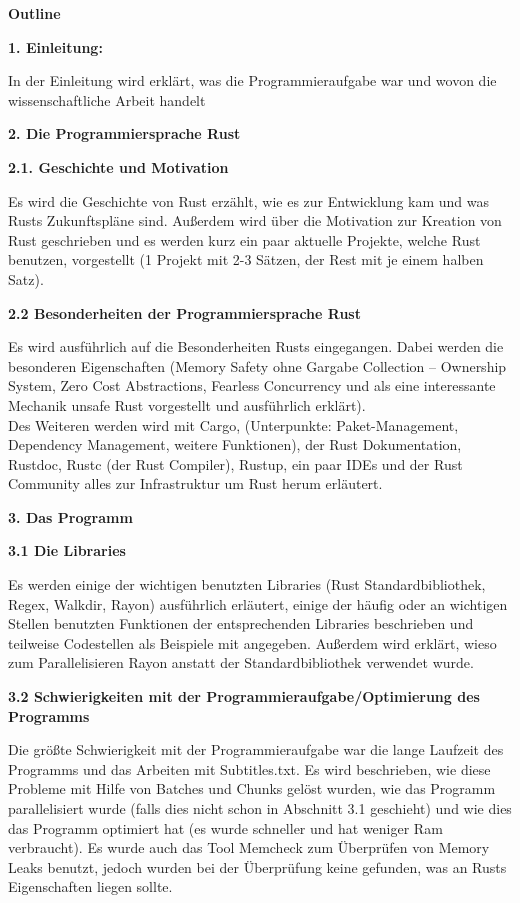 \documentclass[
]{article}
\author{}
\date{}
\begin{document}
\textbf{Outline}

\textbf{1. Einleitung:}

In der Einleitung wird erklärt, was die Programmieraufgabe war und wovon
die wissenschaftliche Arbeit handelt

\textbf{2. Die Programmiersprache Rust}

\textbf{2.1. Geschichte und Motivation}

Es wird die Geschichte von Rust erzählt, wie es zur Entwicklung kam und
was Rusts Zukunftspläne sind. Außerdem wird über die Motivation zur
Kreation von Rust geschrieben und es werden kurz ein paar aktuelle
Projekte, welche Rust benutzen, vorgestellt (1 Projekt mit 2-3 Sätzen,
der Rest mit je einem halben Satz).

\textbf{2.2 Besonderheiten der Programmiersprache Rust}

Es wird ausführlich auf die Besonderheiten Rusts eingegangen. Dabei
werden die besonderen Eigenschaften (Memory Safety ohne Gargabe
Collection -- Ownership System, Zero Cost Abstractions, Fearless
Concurrency und als eine interessante Mechanik unsafe Rust vorgestellt
und ausführlich erklärt).\\
Des Weiteren werden wird mit Cargo, (Unterpunkte: Paket-Management,
Dependency Management, weitere Funktionen), der Rust Dokumentation,
Rustdoc, Rustc (der Rust Compiler), Rustup, ein paar IDEs und der Rust
Community alles zur Infrastruktur um Rust herum erläutert.

\textbf{3. Das Programm}

\textbf{3.1 Die Libraries}

Es werden einige der wichtigen benutzten Libraries (Rust
Standardbibliothek, Regex, Walkdir, Rayon) ausführlich erläutert, einige
der häufig oder an wichtigen Stellen benutzten Funktionen der
entsprechenden Libraries beschrieben und teilweise Codestellen als
Beispiele mit angegeben. Außerdem wird erklärt, wieso zum
Parallelisieren Rayon anstatt der Standardbibliothek verwendet wurde.

\textbf{3.2 Schwierigkeiten mit der Programmieraufgabe/Optimierung des
Programms}

Die größte Schwierigkeit mit der Programmieraufgabe war die lange
Laufzeit des Programms und das Arbeiten mit Subtitles.txt. Es wird
beschrieben, wie diese Probleme mit Hilfe von Batches und Chunks gelöst
wurden, wie das Programm parallelisiert wurde (falls dies nicht schon in
Abschnitt 3.1 geschieht) und wie dies das Programm optimiert hat (es
wurde schneller und hat weniger Ram verbraucht). Es wurde auch das Tool
Memcheck zum Überprüfen von Memory Leaks benutzt, jedoch wurden bei der
Überprüfung keine gefunden, was an Rusts Eigenschaften liegen sollte.
\end{document}
